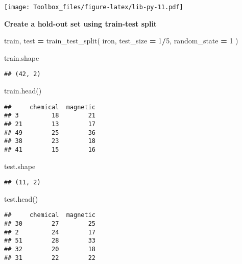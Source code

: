 \documentclass[
]{book}
\newenvironment{Shaded}{\begin{snugshade}}{\end{snugshade}}
\newcommand{\DecValTok}[1]{\textcolor[rgb]{0.00,0.00,0.81}{#1}}
\newcommand{\NormalTok}[1]{#1}
\newcommand{\OperatorTok}[1]{\textcolor[rgb]{0.81,0.36,0.00}{\textbf{#1}}}
\begin{document}
\texttt{[image: Toolbox\_files/figure-latex/lib-py-11.pdf]}

\textbf{Create a hold-out set using train-test split}

\begin{Shaded}
\begin{Highlighting}[]
\NormalTok{train, test }\OperatorTok{=}\NormalTok{ train\_test\_split(}
\NormalTok{  iron, test\_size }\OperatorTok{=} \DecValTok{1}\OperatorTok{/}\DecValTok{5}\NormalTok{, random\_state }\OperatorTok{=} \DecValTok{1}
\NormalTok{)}
\end{Highlighting}
\end{Shaded}

\begin{Shaded}
\begin{Highlighting}[]
\NormalTok{train.shape}
\end{Highlighting}
\end{Shaded}

\begin{verbatim}
## (42, 2)
\end{verbatim}

\begin{Shaded}
\begin{Highlighting}[]
\NormalTok{train.head()}
\end{Highlighting}
\end{Shaded}

\begin{verbatim}
##     chemical  magnetic
## 3         18        21
## 21        13        17
## 49        25        36
## 38        23        18
## 41        15        16
\end{verbatim}

\begin{Shaded}
\begin{Highlighting}[]
\NormalTok{test.shape}
\end{Highlighting}
\end{Shaded}

\begin{verbatim}
## (11, 2)
\end{verbatim}

\begin{Shaded}
\begin{Highlighting}[]
\NormalTok{test.head()}
\end{Highlighting}
\end{Shaded}

\begin{verbatim}
##     chemical  magnetic
## 30        27        25
## 2         24        17
## 51        28        33
## 32        20        18
## 31        22        22
\end{verbatim}
\end{document}
